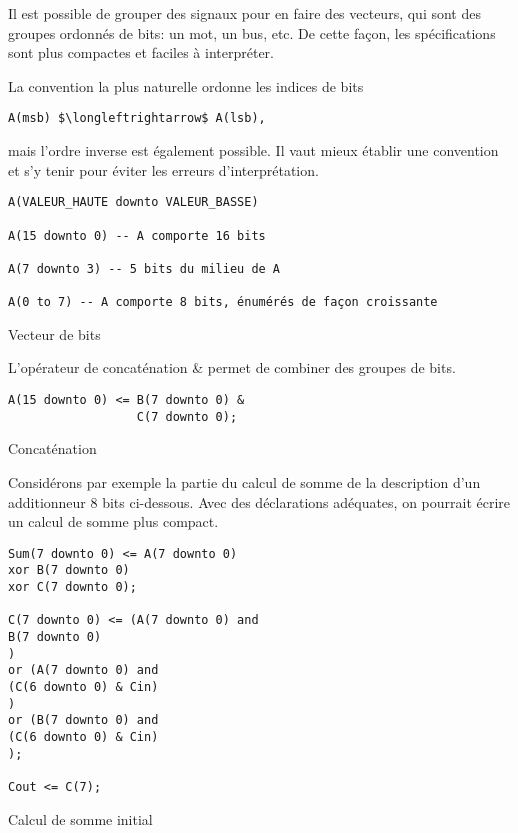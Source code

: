 \documentclass[11pt]{article}
\begin{document}
Il est possible de grouper des signaux pour en faire des vecteurs, qui
sont des groupes ordonnés de bits: un mot, un bus, etc. De cette
façon, les spécifications sont plus compactes et faciles à
interpréter.

La convention la plus naturelle ordonne les indices de bits 
\begin{verbatim}
A(msb) $\longleftrightarrow$ A(lsb),
\end{verbatim}

mais l'ordre inverse est également possible. Il vaut mieux établir une
convention et s'y tenir pour éviter les erreurs d'interprétation.

\begin{listing}[htbp]
\begin{verbatim}
A(VALEUR_HAUTE downto VALEUR_BASSE)

A(15 downto 0) -- A comporte 16 bits

A(7 downto 3) -- 5 bits du milieu de A

A(0 to 7) -- A comporte 8 bits, énumérés de façon croissante
\end{verbatim}
\caption{Vecteur de bits}
\end{listing}

L'opérateur de concaténation \& permet de combiner des groupes de bits.

\begin{listing}[htbp]
\begin{verbatim}
A(15 downto 0) <= B(7 downto 0) &
                  C(7 downto 0);
\end{verbatim}
\caption{Concaténation}
\end{listing}

Considérons par exemple la partie du calcul de somme de la description
d'un additionneur 8 bits ci-dessous.  Avec des déclarations adéquates,
on pourrait écrire un calcul de somme plus compact.

\begin{listing}[htbp]
\begin{verbatim}
Sum(7 downto 0) <= A(7 downto 0)
xor B(7 downto 0)
xor C(7 downto 0);

C(7 downto 0) <= (A(7 downto 0) and
B(7 downto 0)
)
or (A(7 downto 0) and
(C(6 downto 0) & Cin)
)
or (B(7 downto 0) and
(C(6 downto 0) & Cin)
);

Cout <= C(7);
\end{verbatim}
\caption{Calcul de somme initial}
\end{listing}
\end{document}
